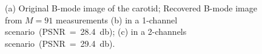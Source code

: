 \documentclass{article}
\theoremstyle{definition}
\begin{document}
\begin{figure}[htb]
	\centering
	\hfill%
	\hfill%
	\hfill%
	\hfill%
	\caption{(a) Original B-mode image of the carotid; Recovered B-mode image from $M=91$ measurements (b) in a \num{1}-channel scenario~(PSNR~=~\SI{28.4}{\decibel}); (c) in a \num{2}-channels scenario~(PSNR~=~\SI{29.4}{\decibel}).}
	\label{fig_carotid}
\end{figure}
\end{document}
